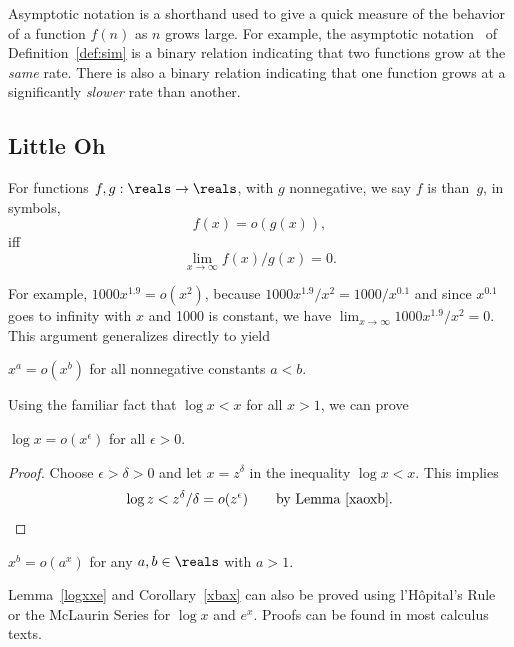 Asymptotic notation is a shorthand used to give a quick measure of the
behavior of a function $f(n)$ as $n$ grows large.  For example, the
asymptotic notation~\idx{$\sim$} of Definition~\ref{def:sim} is a
binary relation indicating that two functions grow at the \emph{same}
rate.  There is also a binary relation indicating that one function
grows at a significantly \emph{slower} rate than another.


\subsection{Little Oh}

\begin{definition}
  For functions $f,g: \reals \to \reals$, with $g$ nonnegative, we say
  $f$ is  than~$g$, in symbols,
\[
f(x) = o(g(x)),
\]
iff
\[
\lim_{x \rightarrow \infty} f(x)/g(x) = 0.
\]
\end{definition}

For example, $1000x^{1.9} = o(x^2)$, because $1000x^{1.9}/x^2 =
1000/x^{0.1}$ and since $x^{0.1}$ goes to infinity with $x$ and 1000 is
constant, we have $\lim_{x \rightarrow \infty} 1000x^{1.9}/x^2 = 0$.
This argument generalizes directly to yield
\begin{lemma}\label{xaoxb}
$x^a = o(x^b)$ for all nonnegative constants $a<b$.
\end{lemma}

Using the familiar fact that  $\log x < x$ for all $x >1$, we can prove
\begin{lemma}\label{logxxe}
$\log x = o(x^{\epsilon})$ for all $\epsilon >0$.
\end{lemma}

\begin{proof}
Choose $\epsilon > \delta > 0$ and let $x = z^\delta$ in the inequality
$\log x < x$.  This implies
\begin{equation}\label{zdd}
\log z  <  z^{\delta}/\delta
 =  o(z^{\epsilon})\qquad \text{by Lemma~\ref{xaoxb}}.
\end{equation}
\end{proof}

\begin{corollary}\label{xbax}
$x^b = o(a^x)$ for any $a,b \in \reals$ with $a>1$.
\end{corollary}

Lemma~\ref{logxxe} and Corollary~\ref{xbax} can also be proved using
l'H\^opital's Rule or the McLaurin Series for $\log x$ and $e^x$.
Proofs can be found in most calculus texts.

